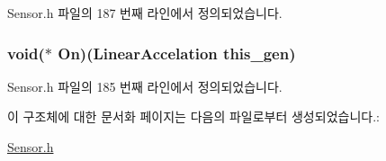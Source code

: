 Sensor.\-h 파일의 187 번째 라인에서 정의되었습니다.

\hypertarget{struct___linear_accelation_a94a5c6752cd1bf18e8d4f1aff25c88e8}{
\subsubsection[{On}]{\setlength{\rightskip}{0pt plus 5cm}void($\ast$  On)({\bf Linear\-Accelation} this\-\_\-gen)}}\label{struct___linear_accelation_a94a5c6752cd1bf18e8d4f1aff25c88e8}


Sensor.\-h 파일의 185 번째 라인에서 정의되었습니다.



이 구조체에 대한 문서화 페이지는 다음의 파일로부터 생성되었습니다.\-:\begin{DoxyCompactItemize}
\item 
\hyperlink{_sensor_8h}{Sensor.\-h}\end{DoxyCompactItemize}

